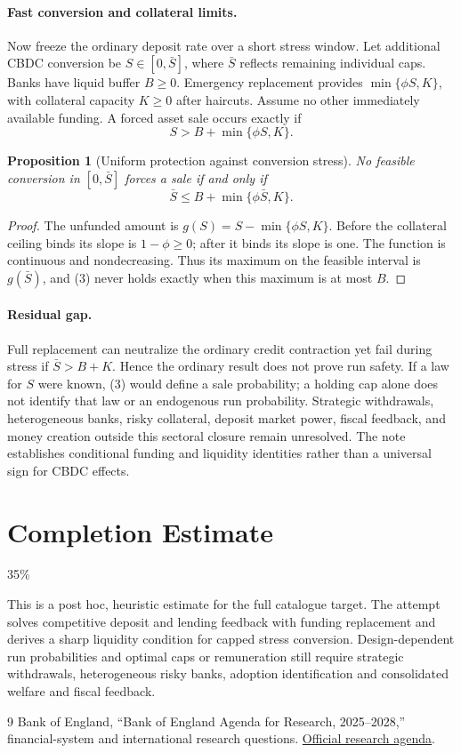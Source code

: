 \documentclass[11pt]{article}
\newtheorem{proposition}[theorem]{Proposition}
\theoremstyle{definition}
\begin{document}
\paragraph{Fast conversion and collateral limits.}
Now freeze the ordinary deposit rate over a short stress window. Let additional CBDC conversion be $S\in[0,\bar S]$, where $\bar S$ reflects remaining individual caps. Banks have liquid buffer $B\geq0$. Emergency replacement provides $\min\{\phi S,K\}$, with collateral capacity $K\geq0$ after haircuts. Assume no other immediately available funding. A forced asset sale occurs exactly if
\[
 S>B+\min\{\phi S,K\}.
 \tag{3}
\]

\begin{proposition}[Uniform protection against conversion stress]
No feasible conversion in $[0,\bar S]$ forces a sale if and only if
\[
 \bar S\leq B+\min\{\phi\bar S,K\}.
\]
\end{proposition}
\begin{proof}
The unfunded amount is $g(S)=S-\min\{\phi S,K\}$. Before the collateral ceiling binds its slope is $1-\phi\geq0$; after it binds its slope is one. The function is continuous and nondecreasing. Thus its maximum on the feasible interval is $g(\bar S)$, and (3) never holds exactly when this maximum is at most $B$.
\end{proof}

\paragraph{Residual gap.}
Full replacement can neutralize the ordinary credit contraction yet fail during stress if $\bar S>B+K$. Hence the ordinary result does not prove run safety. If a law for $S$ were known, (3) would define a sale probability; a holding cap alone does not identify that law or an endogenous run probability. Strategic withdrawals, heterogeneous banks, risky collateral, deposit market power, fiscal feedback, and money creation outside this sectoral closure remain unresolved. The note establishes conditional funding and liquidity identities rather than a universal sign for CBDC effects.

\section{Completion Estimate}
35\%

This is a post hoc, heuristic estimate for the full catalogue target.
The attempt solves competitive deposit and lending feedback with funding replacement and derives a sharp liquidity condition for capped stress conversion. Design-dependent run probabilities and optimal caps or remuneration still require strategic withdrawals, heterogeneous risky banks, adoption identification and consolidated welfare and fiscal feedback.

\begin{thebibliography}{9}
 Bank of England, ``Bank of England Agenda for Research, 2025--2028,'' financial-system and international research questions. \href{https://www.bankofengland.co.uk/research/bank-of-england-agenda-for-research}{Official research agenda}.
\end{thebibliography}
\end{document}
